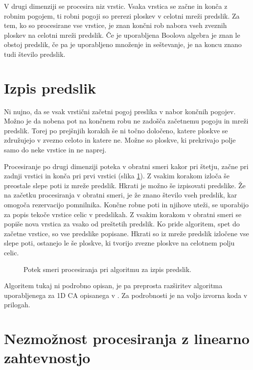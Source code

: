 \documentclass[12pt,a4paper,openany,twoside]{book}
\begin{document}
V drugi dimenziji se procesira niz vrstic. Vsaka vrstica se začne in konča
z robnim pogojem, ti robni pogoji so prerezi ploskev v celotni mreži predslik.
Za tem, ko so procesirane vse vrstice, je znan končni rob nabora vseh zveznih
ploskev na celotni mreži predslik. Če je uporabljena Boolova algebra je znan
le obstoj predslik, če pa je uporabljeno množenje in seštevanje,
je na koncu znano tudi število predslik.

\section{Izpis predslik}

Ni nujno, da se vsak vrstični začetni pogoj preslika v nabor končnih pogojev.
Možno je da nobena pot na končnem robu ne zadošča začetnemu pogoju in mreži predslik.
Torej po prejšnjih korakih še ni točno določeno, katere ploskve se združujejo v zvezno
celoto in katere ne. Možne so ploskve, ki prekrivajo polje samo do neke vrstice in ne naprej.

Procesiranje po drugi dimenziji poteka v obratni smeri kakor pri štetju,
začne pri zadnji vrstici in konča pri prvi vrstici (slika \ref{algorithm_list}).
Z vsakim korakom izloča še preostale slepe poti iz mreže predslik.
Hkrati je možno še izpisovati predslike. Že na začetku procesiranja v obratni smeri,
je že znano število vseh predslik, kar omogoča rezervacijo pomnilnika.
Končne robne poti in njihove uteži, se uporabijo za popis tekoče vrstice celic
v predslikah. Z vsakim korakom v obratni smeri se popiše nova vrstica za vsako od preštetih predslik.
Ko pride algoritem, spet do začetne vrstice, so vse predslike popisane.
Hkrati so iz mreže predslik izločene vse slepe poti, ostanejo le še ploskve,
ki tvorijo zvezne ploskve na celotnem polju celic.

\begin{figure}[htb]
\centerline{}
\caption[Algoritem za izpis predslik.]{Potek smeri procesiranja pri algoritmu za izpis predslik.}
\label{algorithm_list}
\end{figure}

Algoritem tukaj ni podrobno opisan, je pa preprosta razširitev algoritma uporabljenega
za 1D CA opisanega v \cite{JerasDobnikar2007}. Za podrobnosti je na voljo izvorna koda v prilogah.

\section{Nezmožnost procesiranja z linearno zahtevnostjo}
\end{document}
